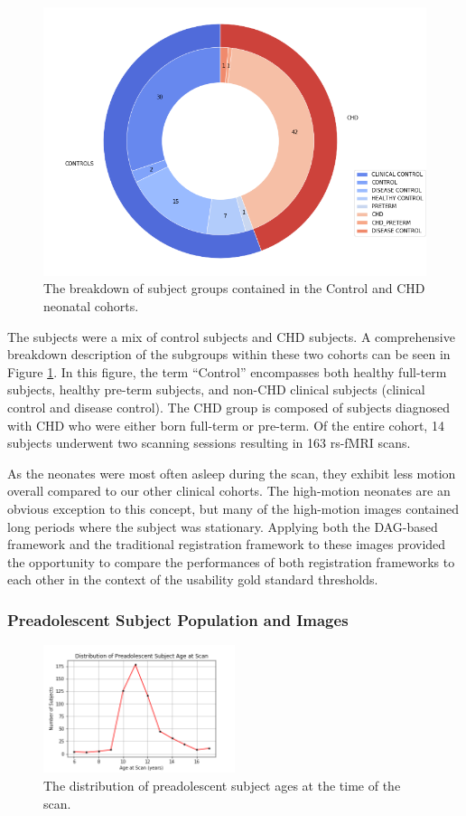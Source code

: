 \begin{figure}
\centering
\includegraphics[width=.75\textwidth]{5/demo_neonate_subj_cohort.png}
\caption{The breakdown of subject groups contained in the Control and CHD neonatal cohorts.}
\label{ch5:neonates:cohorts}
\end{figure}

The subjects were a mix of control subjects and CHD subjects. A comprehensive breakdown description of the subgroups within these two cohorts can be seen in Figure \ref{ch5:neonates:cohorts}. In this figure, the term ``Control'' encompasses both healthy full-term subjects, healthy pre-term subjects, and non-CHD clinical subjects (clinical control and disease control). The CHD group is composed of subjects diagnosed with CHD who were either born full-term or pre-term. Of the entire cohort, 14 subjects underwent two scanning sessions resulting in 163 rs-fMRI scans.

As the neonates were most often asleep during the scan, they exhibit less motion overall compared to our other clinical cohorts. The high-motion neonates are an obvious exception to this concept, but many of the high-motion images contained long periods where the subject was stationary. Applying both the DAG-based framework and the traditional registration framework to these images provided the opportunity to compare the performances of both registration frameworks to each other in the context of the usability gold standard thresholds. 

\subsubsection{Preadolescent Subject Population and Images}

\begin{figure}
\centering
\includegraphics[width=0.5\textwidth]{5/demo_pread_scan_age.png}
\caption{The distribution of preadolescent subject ages at the time of the scan.}
\label{fig:pread_sites}
\end{figure}

